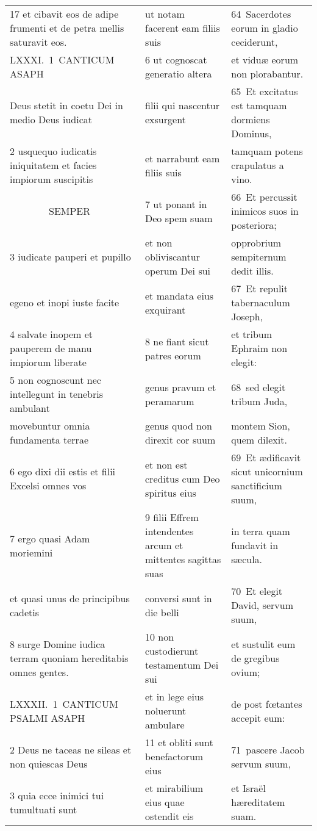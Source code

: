 \documentclass{article}
\begin{document}
\begin{longtable}{@{}p{}p{}p{}@{}}
17 et cibavit eos de adipe frumenti et de petra mellis saturavit eos.	&	ut notam facerent eam filiis suis	&	64 Sacerdotes eorum in gladio ceciderunt,	\\
LXXXI. 1 CANTICUM ASAPH	&	6 ut cognoscat generatio altera	&	et viduæ eorum non plorabantur.	\\
Deus stetit in coetu Dei in medio Deus iudicat	&	filii qui nascentur exsurgent	&	65 Et excitatus est tamquam dormiens Dominus,	\\
2 usquequo iudicatis iniquitatem et facies impiorum suscipitis	&	et narrabunt eam filiis suis	&	tamquam potens crapulatus a vino.	\\
    SEMPER	&	7 ut ponant in Deo spem suam	&	66 Et percussit inimicos suos in posteriora;	\\
3 iudicate pauperi et pupillo	&	et non obliviscantur operum Dei sui	&	opprobrium sempiternum dedit illis.	\\
egeno et inopi iuste facite	&	et mandata eius exquirant	&	67 Et repulit tabernaculum Joseph,	\\
4 salvate inopem et pauperem de manu impiorum liberate	&	8 ne fiant sicut patres eorum	&	et tribum Ephraim non elegit:	\\
5 non cognoscunt nec intellegunt in tenebris ambulant	&	genus pravum et peramarum	&	68 sed elegit tribum Juda,	\\
movebuntur omnia fundamenta terrae	&	genus quod non direxit cor suum	&	montem Sion, quem dilexit.	\\
6 ego dixi dii estis et filii Excelsi omnes vos	&	et non est creditus cum Deo spiritus eius	&	69 Et ædificavit sicut unicornium sanctificium suum,	\\
7 ergo quasi Adam moriemini	&	9 filii Effrem intendentes arcum et mittentes sagittas suas	&	in terra quam fundavit in sæcula.	\\
et quasi unus de principibus cadetis	&	conversi sunt in die belli	&	70 Et elegit David, servum suum,	\\
8 surge Domine iudica terram quoniam hereditabis omnes gentes.	&	10 non custodierunt testamentum Dei sui	&	et sustulit eum de gregibus ovium;	\\
LXXXII. 1 CANTICUM PSALMI ASAPH	&	et in lege eius noluerunt ambulare	&	de post fœtantes accepit eum:	\\
2 Deus ne taceas ne sileas et non quiescas Deus	&	11 et obliti sunt benefactorum eius	&	71 pascere Jacob servum suum,	\\
3 quia ecce inimici tui tumultuati sunt	&	et mirabilium eius quae ostendit eis	&	et Israël hæreditatem suam.	\\

\end{longtable}
\end{document}
